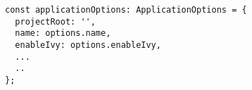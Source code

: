 \begin{verbatim}
const applicationOptions: ApplicationOptions = {
  projectRoot: '',
  name: options.name,
  enableIvy: options.enableIvy,
  ...
  ..
};
\end{verbatim}
